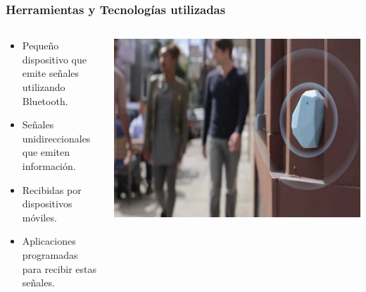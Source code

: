 \begin{frame}
	\frametitle{Herramientas y Tecnologías utilizadas}
	\begin{columns}
		\begin{column}{0.6\textwidth}
			\begin{itemize}
				\item Pequeño dispositivo que emite señales utilizando Bluetooth.
				\item Señales unidireccionales que emiten información.
				\item Recibidas por dispositivos móviles.
				\item Aplicaciones programadas para recibir estas señales.
			\end{itemize}
			\endblock{}
		\end{column}
		\begin{column}{0.4\textwidth}
			\vfill 
			\begin{center}
				\includegraphics[width=0.8\linewidth]{Images/estimoteBeacon}
			\end{center}
		\end{column}
	\end{columns}
\end{frame}

